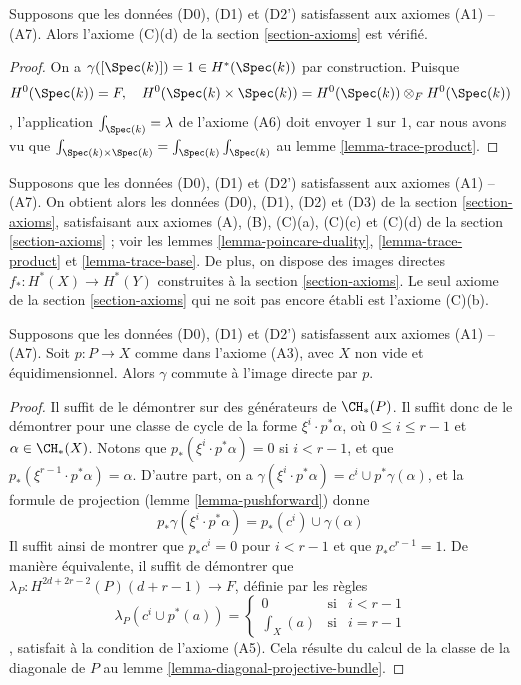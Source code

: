 \begin{lemma}
\label{lemma-trace-base}
Supposons que les données (D0), (D1) et (D2') satisfassent aux axiomes (A1) -- (A7).
Alors l'axiome (C)(d) de la section \ref{section-axioms} est vérifié.
\end{lemma}

\begin{proof}
On a $\gamma([\Spec(k)]) = 1 \in H^*(\Spec(k))$ par construction.
Puisque
$$
H^0(\Spec(k)) = F,\quad
H^0(\Spec(k) \times \Spec(k)) = H^0(\Spec(k)) \otimes_F H^0(\Spec(k))
$$,
l'application $\int_{\Spec(k)} = \lambda$ de l'axiome (A6) doit envoyer $1$ sur $1$,
car nous avons vu que
$\int_{\Spec(k) \times \Spec(k)} = \int_{\Spec(k)} \int_{\Spec(k)}$
au lemme \ref{lemma-trace-product}.
\end{proof}

\noindent
Supposons que les données (D0), (D1) et (D2') satisfassent aux axiomes (A1) -- (A7).
On obtient alors les données (D0), (D1), (D2) et (D3) de la
section \ref{section-axioms},
satisfaisant aux axiomes (A), (B), (C)(a), (C)(c) et (C)(d)
de la section \ref{section-axioms} ; voir
les lemmes \ref{lemma-poincare-duality}, \ref{lemma-trace-product} et
\ref{lemma-trace-base}.
De plus, on dispose des images directes $f_* : H^*(X) \to H^*(Y)$
construites à la section \ref{section-axioms}. Le seul axiome de la
section \ref{section-axioms}
qui ne soit pas encore établi est l'axiome (C)(b).

\begin{lemma}
\label{lemma-ok-for-projective-bundle}
Supposons que les données (D0), (D1) et (D2') satisfassent aux axiomes (A1) -- (A7).
Soit $p : P \to X$ comme dans l'axiome (A3), avec $X$ non vide et équidimensionnel.
Alors $\gamma$ commute à l'image directe par $p$.
\end{lemma}

\begin{proof}
Il suffit de le démontrer sur des générateurs de $\CH_*(P)$.
Il suffit donc de le démontrer pour une classe de cycle de la
forme $\xi^i \cdot p^*\alpha$, où $0 \leq i \leq r - 1$
et $\alpha \in \CH_*(X)$. Notons que $p_*(\xi^i \cdot p^*\alpha) = 0$
si $i < r - 1$, et que $p_*(\xi^{r - 1} \cdot p^*\alpha) = \alpha$.
D'autre part, on a
$\gamma(\xi^i \cdot p^*\alpha) = c^i \cup p^*\gamma(\alpha)$,
et la formule de projection (lemme \ref{lemma-pushforward})
donne
$$
p_*\gamma(\xi^i \cdot p^*\alpha) = p_*(c^i) \cup \gamma(\alpha)
$$
Il suffit ainsi de montrer que $p_*c^i = 0$ pour $i < r - 1$ et
que $p_*c^{r - 1} = 1$. De manière équivalente, il suffit de démontrer que
$\lambda_P : H^{2d + 2r - 2}(P)(d + r - 1) \to F$, définie par
les règles
$$
\lambda_P(c^i \cup p^*(a)) =
\left\{
\begin{matrix}
0 & \text{si} & i < r - 1 \\
\int_X(a) & \text{si} & i = r - 1
\end{matrix}
\right.
$$,
satisfait à la condition de l'axiome (A5). Cela résulte du
calcul de la classe de la diagonale de $P$ au
lemme \ref{lemma-diagonal-projective-bundle}.
\end{proof}

